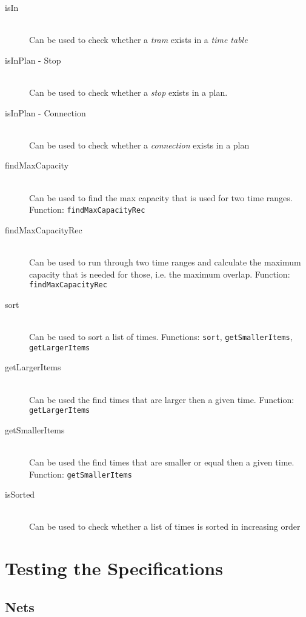 \documentclass[a4]{article}
\begin{document}
\begin{description}
    \item[isIn] \hfill \\ Can be used to check whether a \emph{tram} exists in a \emph{time table}
    \item[isInPlan - Stop] \hfill \\ Can be used to check whether a \emph{stop} exists in a plan.
    \item[isInPlan - Connection] \hfill \\ Can be used to check whether a \emph{connection} exists in a plan
    \item[findMaxCapacity] \hfill \\ Can be used to find the max capacity that is used for two time ranges. Function: \verb=findMaxCapacityRec=
    \item[findMaxCapacityRec] \hfill \\ Can be used to run through two time ranges and calculate the maximum capacity that is needed for those, i.e. the maximum overlap. Function: \verb=findMaxCapacityRec=
    \item[sort] \hfill \\ Can be used to sort a list of times. Functions: \verb=sort=, \verb=getSmallerItems=, \verb=getLargerItems=
    \item[getLargerItems] \hfill \\ Can be used the find times that are larger then a given time. Function: \verb=getLargerItems=
    \item[getSmallerItems] \hfill \\ Can be used the find times that are smaller or equal then a given time. Function: \verb=getSmallerItems=
    \item[isSorted] \hfill \\ Can be used to check whether a list of times is sorted in increasing order
\end{description}

\section{Testing the Specifications}

\subsection{Nets}


\end{document}
